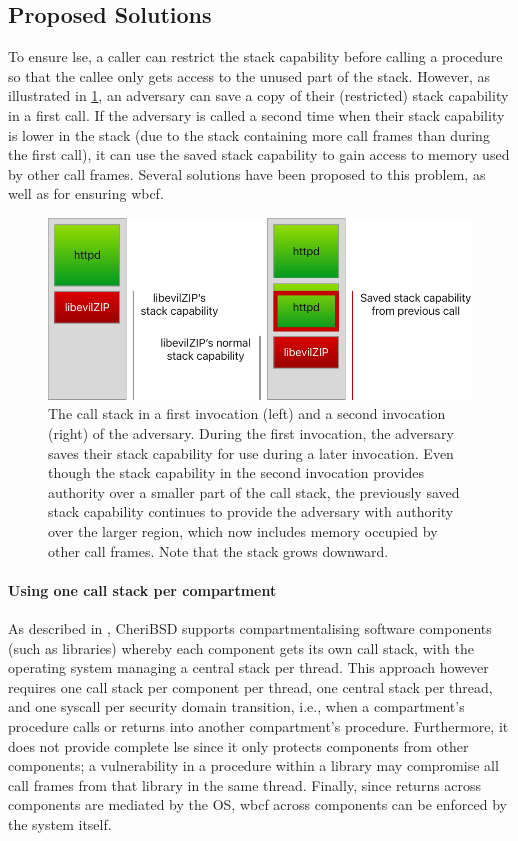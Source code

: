 \documentclass[main.tex]{subfiles}
\begin{document}
\subsection*{Proposed Solutions}
To ensure \gls{lse}, a caller can restrict the stack capability before calling a procedure so that the callee only gets access to the unused part of the stack. However, as illustrated in \cref{fig:savedstackcap}, an adversary can save a copy of their (restricted) stack capability in a first call. If the adversary is called a second time when their stack capability is lower in the stack (due to the stack containing more call frames than during the first call), it can use the saved stack capability to gain access to memory used by other call frames. Several solutions have been proposed to this problem, as well as for ensuring \gls{wbcf}.

\begin{figure}
	\begin{center}
		\includegraphics{Images/Saved Stack Cap.pdf}
	\end{center}
	\caption{The call stack in a first invocation (left) and a second invocation (right) of the adversary. During the first invocation, the adversary saves their stack capability for use during a later invocation. Even though the stack capability in the second invocation provides authority over a smaller part of the call stack, the previously saved stack capability continues to provide the adversary with authority over the larger region, which now includes memory occupied by other call frames. Note that the stack grows downward.}
	\label{fig:savedstackcap}
\end{figure}

\paragraph{Using one call stack per compartment} As described in \cite{compartment}, CheriBSD supports compartmentalising software components (such as libraries) whereby each component gets its own call stack, with the operating system managing a central stack per thread. This approach however requires one call stack per component per thread, one central stack per thread, and one syscall per security domain transition, i.e., when a compartment's procedure calls or returns into another compartment's procedure. Furthermore, it does not provide complete \gls{lse} since it only protects components from other components; a vulnerability in a procedure within a library may compromise all call frames from that library in the same thread. Finally, since returns across components are mediated by the OS, \gls{wbcf} across components can be enforced by the system itself.
\end{document}
